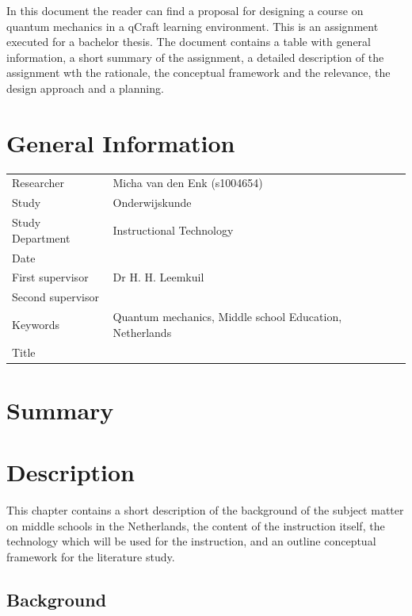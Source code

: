 \documentclass[12pt]{report} %
\begin{document}
In this document the reader can find a proposal for designing a course on quantum mechanics in a qCraft learning environment. This is an assignment executed for a bachelor thesis. The document contains a table with general information, a short summary of the assignment, a detailed description of the assignment wth the rationale, the conceptual framework and the relevance, the design approach and a planning.

\chapter{General Information}

\begin{center}
\begin{tabular}{ l p{8cm} }
Researcher & Micha van den Enk (s1004654) \\
Study & Onderwijskunde \\
Study Department & Instructional Technology \\ 
Date & \\
First supervisor & Dr H. H. Leemkuil \\
Second supervisor & \\
Keywords & Quantum mechanics, Middle school Education, Netherlands \\
Title & \\
\end{tabular}
\end{center}

\chapter{Summary}

\chapter{Description}

This chapter contains a short description of the background of the subject matter on middle schools in the Netherlands, the content of the instruction itself, the technology which will be used for the instruction, and an outline conceptual framework for the literature study.

\section{Background}
\end{document}
